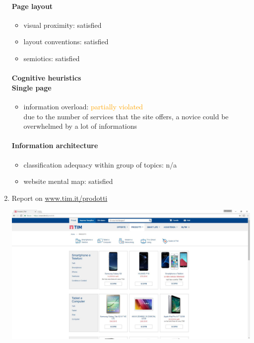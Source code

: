 \begin{enumerate}
	\paragraph*{Page layout}
	\begin{itemize}
		\item visual proximity: satisfied
		\item layout conventions: satisfied
		\item semiotics: satisfied
	\end{itemize}	
	
	\paragraph*{Cognitive heuristics \\ Single page}
	\begin{itemize}
		\item information overload: \textcolor{orange}{partially violated}\\
		due to the number of services that the site offers, a novice could be overwhelmed by a lot of informations
	\end{itemize}	
	
	\paragraph*{Information architecture}
	\begin{itemize}
		\item classification adequacy within group of topics: n/a
		\item website mental map: satisfied
	\end{itemize}
\newpage

\item Report on \url{www.tim.it/prodotti}

\begin{center}
	\includegraphics[width=\textwidth]{Screenshot/prodotti.jpg}
\end{center}
\vspace{1cm}


\end{enumerate}
